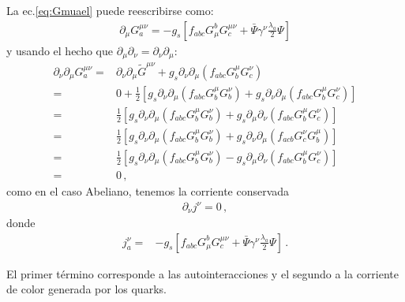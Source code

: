 La ec.\eqref{eq:Gmuael} puede reescribirse como:
\begin{align}
  \partial_\mu G^{\mu\nu}_a=-g_s\left[f_{abc}G^b_\mu G^{\mu\nu}_c+\bar{\Psi}\gamma^\nu\frac{\lambda_a}{2}\Psi  \right]
\end{align}
y usando el hecho que $\partial_\mu\partial_\nu=\partial_\nu\partial_\mu$:
\begin{align}
  \partial_\nu\partial_\mu G^{\mu\nu}_a=&\partial_\nu\partial_\mu\widetilde{G}^{\mu\nu}+g_s\partial_\nu\partial_\mu\left(f_{abc}G^\mu_bG^\nu_c\right)\nonumber\\
=&0+\frac{1}{2}\left[g_s\partial_\nu\partial_\mu\left(f_{abc}G^\mu_bG^\nu_b\right)+g_s\partial_\nu\partial_\mu\left(f_{abc}G^\mu_bG^\nu_c\right)\right]\nonumber\\
=&\frac{1}{2}\left[g_s\partial_\nu\partial_\mu\left(f_{abc}G^\mu_bG^\nu_b\right)+g_s\partial_\mu\partial_\nu\left(f_{abc}G^\mu_bG^\nu_c\right)\right]\nonumber\\
=&\frac{1}{2}\left[g_s\partial_\nu\partial_\mu\left(f_{abc}G^\mu_bG^\nu_b\right)+g_s\partial_\nu\partial_\mu\left(f_{acb}G^\nu_cG^\mu_b\right)\right]\nonumber\\
=&\frac{1}{2}\left[g_s\partial_\nu\partial_\mu\left(f_{abc}G^\mu_bG^\nu_b\right)-g_s\partial_\mu\partial_\nu\left(f_{abc}G^\mu_bG^\nu_c\right)\right]\nonumber\\
=&0\,,
\end{align}
como en el caso Abeliano, tenemos la corriente conservada
\begin{align}
  \partial_\nu j^\nu=0\,,
\end{align}
donde
\begin{align}
\label{eq:jnuqcd}
  j^\nu_a=&-g_s\left[f_{abc}G^b_\mu G^{\mu\nu}_c+\bar{\Psi}\gamma^\nu\frac{\lambda_a}{2}\Psi  \right]\,.
\end{align}

El primer término corresponde a las autointeracciones y el segundo a la corriente de color generada por los quarks.


\renewcommand{\labelenumi}{\theenumi} %


%
